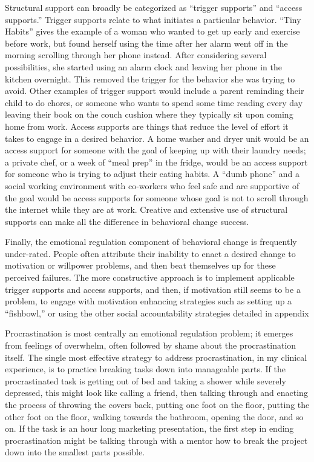 \documentclass[12pt,letterpaper]{article}
\begin{document}
Structural support can broadly be categorized as “trigger supports” and “access supports.” Trigger supports relate to what initiates a particular behavior. “Tiny Habits” gives the example of a woman who wanted to get up early and exercise before work, but found herself using the time after her alarm went off in the morning scrolling through her phone instead. After considering several possibilities, she started using an alarm clock and leaving her phone in the kitchen overnight. This removed the trigger for the behavior she was trying to avoid. Other examples of trigger support would include a parent reminding their child to do chores, or someone who wants to spend some time reading every day leaving their book on the couch cushion where they typically sit upon coming home from work. Access supports are things that reduce the level of effort it takes to engage in a desired behavior. A home washer and dryer unit would be an access support for someone with the goal of keeping up with their laundry needs; a private chef, or a week of “meal prep” in the fridge, would be an access support for someone who is trying to adjust their eating habits. A “dumb phone” and a social working environment with co-workers who feel safe and are supportive of the goal would be access supports for someone whose goal is not to scroll through the internet while they are at work. Creative and extensive use of structural supports can make all the difference in behavioral change success.

Finally, the emotional regulation component of behavioral change is frequently under-rated. People often attribute their inability to enact a desired change to motivation or willpower problems, and then beat themselves up for these perceived failures. The more constructive approach is to implement applicable trigger supports and access supports, and then, if motivation still seems to be a problem, to engage with motivation enhancing strategies such as setting up a “fishbowl,” or using the other social accountability strategies detailed in appendix \todo{}

Procrastination is most centrally an emotional regulation problem; it emerges from feelings of overwhelm, often followed by shame about the procrastination itself. The single most effective strategy to address procrastination, in my clinical experience, is to practice breaking tasks down into manageable parts. If the procrastinated task is getting out of bed and taking a shower while severely depressed, this might look like calling a friend, then talking through and enacting the process of throwing the covers back, putting one foot on the floor, putting the other foot on the floor, walking towards the bathroom, opening the door, and so on. If the task is an hour long marketing presentation, the first step in ending procrastination might be talking through with a mentor how to break the project down into the smallest parts possible.
\end{document}
